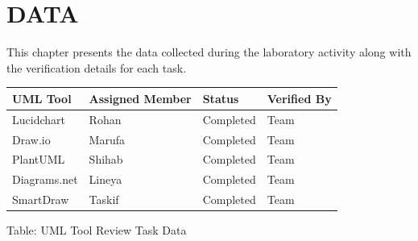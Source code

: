 \chapter{DATA}
\label{ch:data}

This chapter presents the data collected during the laboratory activity along with the verification details for each task.

\begin{table}[H]
\centering
\begin{tabular}{l l l l}
\toprule
\textbf{UML Tool} & \textbf{Assigned Member} & \textbf{Status} & \textbf{Verified By} \\
\midrule
Lucidchart & Rohan & Completed & Team \\
Draw.io & Marufa & Completed & Team \\
PlantUML & Shihab & Completed & Team \\
Diagrams.net & Lineya & Completed & Team \\
SmartDraw & Taskif & Completed & Team \\
\bottomrule
\end{tabular}
\end{table}

\begin{center}
Table: UML Tool Review Task Data
\end{center}


